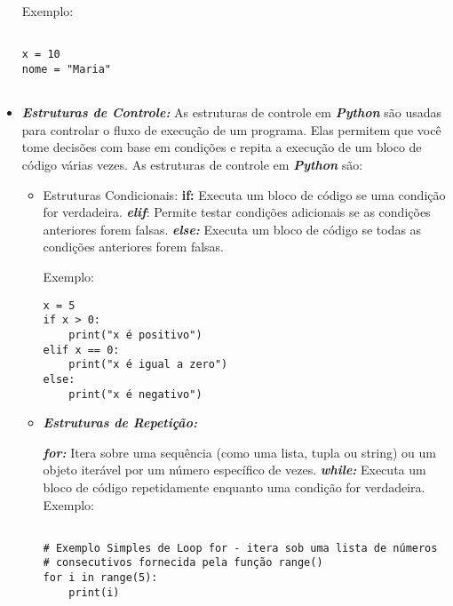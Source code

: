 \documentclass[a4paper, 12pt, onecolumn,singlespacing]{article}
\begin{document}
\begin{itemize}
	Exemplo:
	
	\begin{verbatim}
			
x = 10
nome = "Maria"
			
	\end{verbatim}
	\label{exemplo_curto_atribuição}
	
	\item \textbf{\textit{Estruturas de Controle:}} As estruturas de controle em \textbf{\textit{Python}} são usadas para controlar o fluxo de execução de um programa. Elas permitem que você tome decisões com base em condições e repita a execução de um bloco de código várias vezes. As estruturas de controle em \textbf{\textit{Python}} são:
	\begin{itemize}
		\item 	Estruturas Condicionais:
			\subitem \textbf{if:} Executa um bloco de código se uma condição for verdadeira.
			\subitem \textbf{\textit{elif}}: Permite testar condições adicionais se as condições anteriores forem falsas.
			\subitem \textbf{\textit{else:}} Executa um bloco de código se todas as condições anteriores forem falsas.
	
	Exemplo:
	
	\begin{verbatim}
x = 5
if x > 0:
	print("x é positivo")
elif x == 0:
	print("x é igual a zero")
else:
	print("x é negativo")

\end{verbatim}
\label{exemplo_estruturas_condicionais}

		\item \textbf{\textit{Estruturas de Repetição:}}
		
			\subitem \textbf{\textit{for:}} Itera sobre uma sequência (como uma lista, tupla ou string) ou um objeto iterável por um número específico de vezes.
			\subitem \textbf{\textit{while:}} Executa um bloco de código repetidamente enquanto uma condição for verdadeira.
			Exemplo: 
\begin{verbatim}
	
# Exemplo Simples de Loop for - itera sob uma lista de números
# consecutivos fornecida pela função range()
for i in range(5):
	print(i)


\end{verbatim}
\end{itemize}
\end{itemize}
\end{document}
